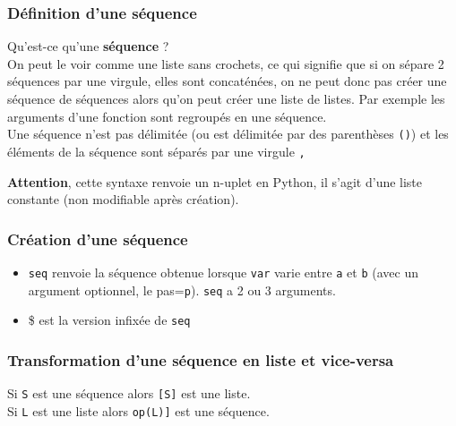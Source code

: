 \documentclass[12pt,a4paper]{book}
\begin{document}
\begin{giacjshere}
\subsubsection{D\'efinition d'une s\'equence}\index{()}
Qu'est-ce qu'une {\bf s\'equence} ?\\
On peut le voir comme une liste sans crochets, ce qui signifie
que si on s\'epare 2 s\'equences par une virgule, elles sont
concat\'en\'ees, on ne peut
donc pas cr\'eer une s\'equence de s\'equences alors qu'on peut cr\'eer
une liste de listes. Par exemple les arguments d'une fonction sont
regroup\'es en une s\'equence.\\
Une s\'equence n'est pas d\'elimit\'ee 
(ou est d\'elimit\'ee par des parenth\`eses {\tt ()}) et les \'el\'ements
 de la s\'equence sont s\'epar\'es par une virgule {\tt ,}\\ 

{\bf Attention}, 
cette syntaxe renvoie un n-uplet en Python, il s'agit d'une liste
constante (non modifiable apr\`es cr\'eation).

\subsubsection{Cr\'eation d'une s\'equence}\index{\$}
\begin{itemize}
\item {\tt seq} renvoie la s\'equence obtenue lorsque {\tt var} varie entre 
{\tt a} et {\tt  b} (avec un argument optionnel, le pas={\tt p}).
{\tt seq}  a 2 ou 3 arguments.\\
\item \$ est la version infix\'ee de {\tt seq}\\
\end{itemize}

\subsubsection{Transformation d'une s\'equence en liste et vice-versa}
\index{[]}
Si {\tt S} est une s\'equence alors {\tt [S]} est une liste.\\
Si {\tt L} est une liste  alors {\tt op(L)]} est une s\'equence.\\
\\
\\
\\
\giacinput{[S]}


\end{giacjshere}
\end{document}
